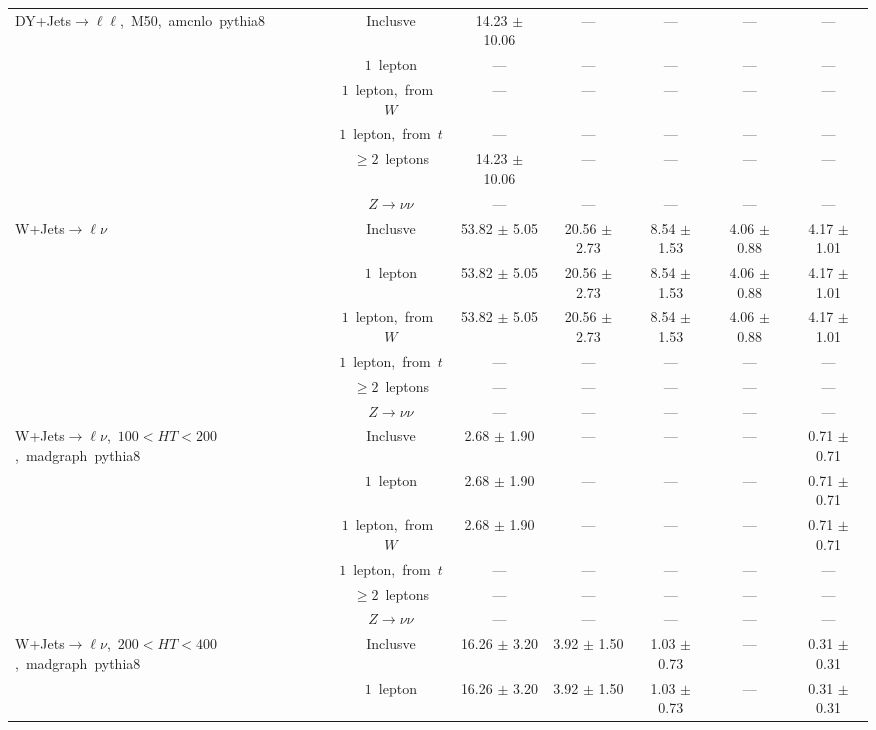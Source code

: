 \documentclass{article}
\begin{document}
\begin{longtable}{|l|c|c|c|c|c|c|}
\hline 
\multirow{6}{*}{DY+Jets$\rightarrow\ell\ell$,~M50,~amcnlo~pythia8} & Inclusve  & 14.23 $\pm$ 10.06  & ---  & ---  & ---  & --- \\* 
 & $1$~lepton  & ---  & ---  & ---  & ---  & --- \\* 
 & $1$~lepton,~from~$W$  & ---  & ---  & ---  & ---  & --- \\* 
 & $1$~lepton,~from~$t$  & ---  & ---  & ---  & ---  & --- \\* 
 & $\ge2$~leptons  & 14.23 $\pm$ 10.06  & ---  & ---  & ---  & --- \\* 
 & $Z\rightarrow\nu\nu$  & ---  & ---  & ---  & ---  & --- \\* 
\hline 
\multirow{6}{*}{W+Jets$\rightarrow\ell\nu$} & Inclusve  & 53.82 $\pm$ 5.05  & 20.56 $\pm$ 2.73  & 8.54 $\pm$ 1.53  & 4.06 $\pm$ 0.88  & 4.17 $\pm$ 1.01 \\* 
 & $1$~lepton  & 53.82 $\pm$ 5.05  & 20.56 $\pm$ 2.73  & 8.54 $\pm$ 1.53  & 4.06 $\pm$ 0.88  & 4.17 $\pm$ 1.01 \\* 
 & $1$~lepton,~from~$W$  & 53.82 $\pm$ 5.05  & 20.56 $\pm$ 2.73  & 8.54 $\pm$ 1.53  & 4.06 $\pm$ 0.88  & 4.17 $\pm$ 1.01 \\* 
 & $1$~lepton,~from~$t$  & ---  & ---  & ---  & ---  & --- \\* 
 & $\ge2$~leptons  & ---  & ---  & ---  & ---  & --- \\* 
 & $Z\rightarrow\nu\nu$  & ---  & ---  & ---  & ---  & --- \\* 
\hline 
\multirow{6}{*}{W+Jets$\rightarrow\ell\nu$,~$100<HT<200$,~madgraph~pythia8} & Inclusve  & 2.68 $\pm$ 1.90  & ---  & ---  & ---  & 0.71 $\pm$ 0.71 \\* 
 & $1$~lepton  & 2.68 $\pm$ 1.90  & ---  & ---  & ---  & 0.71 $\pm$ 0.71 \\* 
 & $1$~lepton,~from~$W$  & 2.68 $\pm$ 1.90  & ---  & ---  & ---  & 0.71 $\pm$ 0.71 \\* 
 & $1$~lepton,~from~$t$  & ---  & ---  & ---  & ---  & --- \\* 
 & $\ge2$~leptons  & ---  & ---  & ---  & ---  & --- \\* 
 & $Z\rightarrow\nu\nu$  & ---  & ---  & ---  & ---  & --- \\* 
\hline 
\multirow{6}{*}{W+Jets$\rightarrow\ell\nu$,~$200<HT<400$,~madgraph~pythia8} & Inclusve  & 16.26 $\pm$ 3.20  & 3.92 $\pm$ 1.50  & 1.03 $\pm$ 0.73  & ---  & 0.31 $\pm$ 0.31 \\* 
 & $1$~lepton  & 16.26 $\pm$ 3.20  & 3.92 $\pm$ 1.50  & 1.03 $\pm$ 0.73  & ---  & 0.31 $\pm$ 0.31 \\* 

\end{longtable}
\end{document}
